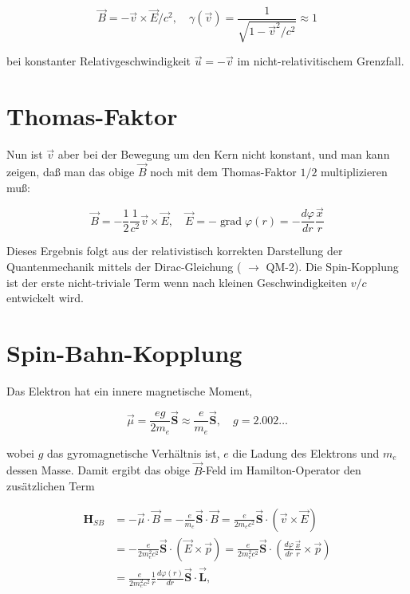 \documentclass[10pt, letterpaper]{article}
\begin{document}
$$
\vec{B}=-\vec{v} \times \vec{E} / c^{2}, \quad \gamma(\vec{v})=\frac{1}{\sqrt{1-\vec{v}^{2} / c^{2}}} \approx 1
$$

bei konstanter Relativgeschwindigkeit $\vec{u}=-\vec{v}$ im nicht-relativitischem Grenzfall.

\section*{Thomas-Faktor}
Nun ist $\vec{v}$ aber bei der Bewegung um den Kern nicht konstant, und man kann zeigen, daß man das obige $\vec{B}$ noch mit dem Thomas-Faktor $1 / 2$ multiplizieren muß:

$$
\vec{B}=-\frac{1}{2} \frac{1}{c^{2}} \vec{v} \times \vec{E}, \quad \vec{E}=-\operatorname{grad} \varphi(r)=-\frac{d \varphi}{d r} \frac{\vec{x}}{r}
$$

Dieses Ergebnis folgt aus der relativistisch korrekten Darstellung der Quantenmechanik mittels der Dirac-Gleichung ( $\rightarrow$ QM-2). Die Spin-Kopplung ist der erste nicht-triviale Term wenn nach kleinen Geschwindigkeiten $v / c$ entwickelt wird.

\section*{Spin-Bahn-Kopplung}
Das Elektron hat ein innere magnetische Moment,

$$
\vec{\mu}=\frac{e g}{2 m_{e}} \overrightarrow{\mathbf{S}} \approx \frac{e}{m_{e}} \overrightarrow{\mathbf{S}}, \quad g=2.002 \ldots
$$

wobei $g$ das gyromagnetische Verhältnis ist, $e$ die Ladung des Elektrons und $m_{e}$ dessen Masse. Damit ergibt das obige $\vec{B}$-Feld im Hamilton-Operator den zusätzlichen Term

$$
\begin{aligned}
\mathbf{H}_{S B} & =-\vec{\mu} \cdot \vec{B}=-\frac{e}{m_{e}} \overrightarrow{\mathbf{S}} \cdot \vec{B}=\frac{e}{2 m_{e} c^{2}} \overrightarrow{\mathbf{S}} \cdot(\vec{v} \times \vec{E}) \\
& =-\frac{e}{2 m_{e}^{2} c^{2}} \overrightarrow{\mathbf{S}} \cdot(\vec{E} \times \vec{p})=\frac{e}{2 m_{e}^{2} c^{2}} \overrightarrow{\mathbf{S}} \cdot\left(\frac{d \varphi}{d r} \frac{\vec{x}}{r} \times \vec{p}\right) \\
& =\frac{e}{2 m_{e}^{2} c^{2}} \frac{1}{r} \frac{d \varphi(r)}{d r} \overrightarrow{\mathbf{S}} \cdot \overrightarrow{\mathbf{L}},
\end{aligned}
$$
\end{document}
